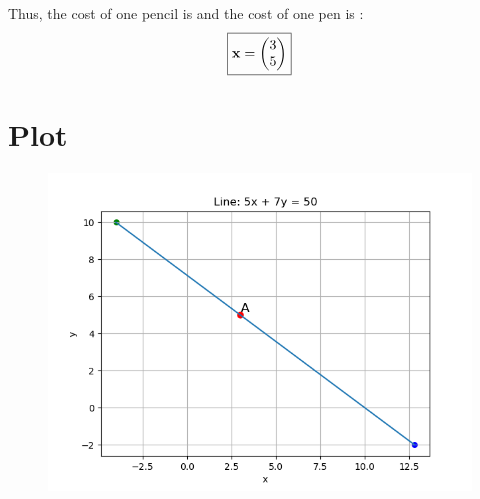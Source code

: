 \documentclass[14pt]{extarticle}
\begin{document}
Thus, the cost of one pencil is  and the cost of one pen is :
\begin{align}
\boxed{
\mathbf{x} = \begin{pmatrix}3 \\ 5\end{pmatrix}
}
\end{align}

\section*{Plot}
\begin{figure}[!h]
    \centering
    \includegraphics[width=1.2\columnwidth]{Figs/Figure_1.png}
\end{figure}
\end{document}
